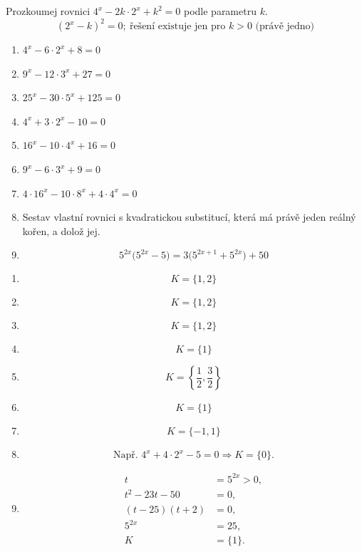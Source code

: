 \documentclass[11pt,a4paper]{article}
\begin{document}
\begin{zadaniReseniBox}[title={Rozšíření 1}]
Prozkoumej rovnici $4^x-2k\cdot2^x+k^2=0$ podle parametru $k$.
\tcblower
\[
(2^x-k)^2=0;\ \text{řešení existuje jen pro }k>0\text{ (právě jedno)}
\]
\end{zadaniReseniBox}
\begin{zadaniReseniBox}[title={Domácí úkol}]
\begin{enumerate}[label=\alph*)]
\item $4^x-6\cdot2^x+8=0$
\item $9^x-12\cdot3^x+27=0$
\item $25^x-30\cdot5^x+125=0$
\item $4^x+3\cdot2^x-10=0$
\item $16^x-10\cdot4^x+16=0$
\item $9^x-6\cdot3^x+9=0$
\item $4\cdot16^x-10\cdot8^x+4\cdot4^x=0$
\item Sestav vlastní rovnici s kvadratickou substitucí, která má právě jeden reálný kořen, a dolož jej.
\item \[ 5^{2x}\bigl(5^{2x}-5\bigr)=3\bigl(5^{2x+1}+5^{2x}\bigr)+50 \]
\end{enumerate}
\tcblower
\setlength{\abovedisplayskip}{2pt}\setlength{\belowdisplayskip}{2pt}
\setlength{\abovedisplayshortskip}{2pt}\setlength{\belowdisplayshortskip}{2pt}
\begin{enumerate}[label=\alph*)]
\item \[K=\{1,2\}\]
\item \[K=\{1,2\}\]
\item \[K=\{1,2\}\]
\item \[K=\{1\}\]
\item \[K=\left\{\frac{1}{2},\frac{3}{2}\right\}\]
\item \[K=\{1\}\]
\item \[K=\{-1,1\}\]
\item \[\text{Např. }4^x+4\cdot2^x-5=0\Rightarrow K=\{0\}.\]
\item \[\begin{aligned}t&=5^{2x}>0,\\t^2-23t-50&=0,\\(t-25)(t+2)&=0,\\5^{2x}&=25,\\K&=\{1\}.\end{aligned}\]
\end{enumerate}
\end{zadaniReseniBox}
\end{document}
